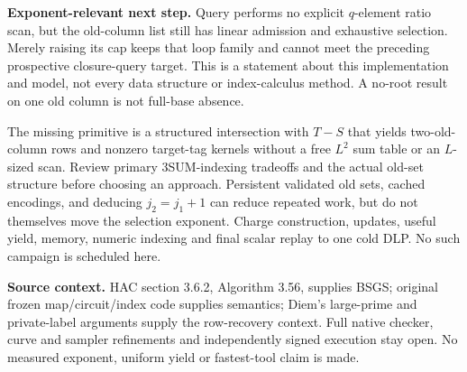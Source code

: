 \documentclass[10pt]{article}
\begin{document}
\textbf{Exponent-relevant next step.} Query performs no explicit $q$-element
ratio scan, but the old-column list still has linear admission and exhaustive
selection. Merely raising its cap keeps that loop family and cannot meet
the preceding prospective closure-query target. This is a statement about
this implementation and model, not every data structure or index-calculus
method. A no-root result on one old column is not full-base absence.

The missing primitive is a structured intersection with $T-S$ that yields
two-old-column rows and nonzero target-tag kernels without a free $L^2$ sum
table or an $L$-sized scan. Review primary 3SUM-indexing tradeoffs and the
actual old-set structure before choosing an approach. Persistent validated
old sets, cached encodings, and deducing $j_2=j_1+1$ can reduce repeated work,
but do not themselves move the selection exponent. Charge construction,
updates, useful yield, memory, numeric indexing and final scalar replay to
one cold DLP. No such campaign is scheduled here.

\textbf{Source context.} HAC section 3.6.2, Algorithm 3.56, supplies BSGS;
original frozen map/circuit/index code supplies semantics; Diem's large-prime
and private-label arguments supply the row-recovery context. Full native
checker, curve and sampler refinements and independently signed execution stay
open. No measured exponent, uniform yield or fastest-tool claim is made.
\end{document}
